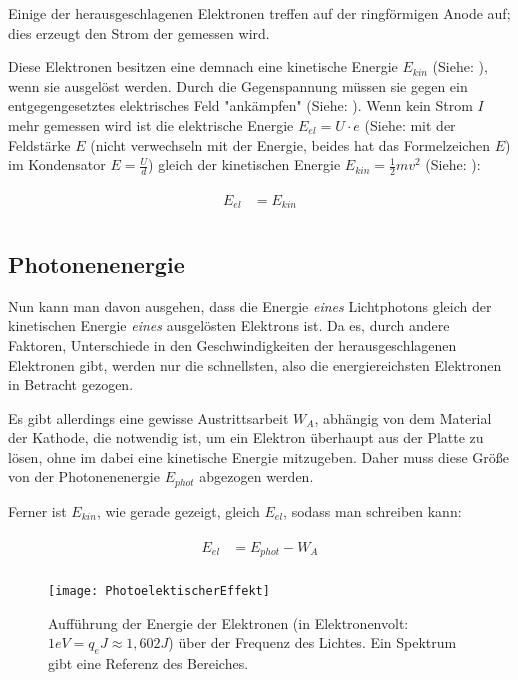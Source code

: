 Einige der herausgeschlagenen Elektronen treffen auf der ringförmigen Anode auf; dies erzeugt den Strom der gemessen wird.

Diese Elektronen besitzen eine demnach eine kinetische Energie $E_{kin}$ (Siehe: ), wenn sie ausgelöst werden. Durch die Gegenspannung müssen sie gegen ein entgegengesetztes elektrisches Feld "ankämpfen" (Siehe: ). Wenn kein Strom $I$ mehr gemessen wird ist die elektrische Energie $E_{el} = U \cdot e$ (Siehe:  mit der Feldstärke $E$ (nicht verwechseln mit der Energie, beides hat das Formelzeichen $E$) im Kondensator $E=\frac{U}{d}$) gleich der kinetischen Energie $E_{kin} = \frac{1}{2} m v^2$ (Siehe: ):

\begin{align}
\begin{split}
	E_{el} &= E_{kin} \\
\end{split}
\end{align}


\subsection{Photonenenergie}

Nun kann man davon ausgehen, dass die Energie \emph{eines} Lichtphotons gleich der kinetischen Energie \emph{eines} ausgelösten Elektrons ist. Da es, durch andere Faktoren, Unterschiede in den Geschwindigkeiten der herausgeschlagenen Elektronen gibt, werden nur die schnellsten, also die energiereichsten Elektronen in Betracht gezogen. 

Es gibt allerdings eine gewisse Austrittsarbeit $W_A$, abhängig von dem Material der Kathode, die notwendig ist, um ein Elektron überhaupt aus der Platte zu lösen, ohne im dabei eine kinetische Energie mitzugeben. Daher muss diese Größe von der Photonenenergie $E_{phot}$ abgezogen werden.

Ferner ist $E_{kin}$, wie gerade gezeigt, gleich $E_{el}$, sodass man schreiben kann:

\begin{align} \label{eq:EelmitWA}
\begin{split}
	E_{el} &= E_{phot} - W_A \\
\end{split}
\end{align}

\begin{figure}[h!]
	\centering
	\texttt{[image: PhotoelektischerEffekt]}
	\caption{Aufführung der Energie der Elektronen (in Elektronenvolt: $1 eV = q_e J \approx 1,602 J$) über der Frequenz des Lichtes. Ein Spektrum gibt eine Referenz des Bereiches.}
	\label{fig:Fotoeffekt}
\end{figure}

